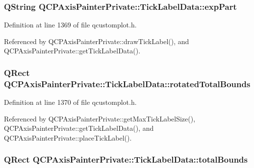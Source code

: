 \subsubsection[{exp\+Part}]{\setlength{\rightskip}{0pt plus 5cm}Q\+String Q\+C\+P\+Axis\+Painter\+Private\+::\+Tick\+Label\+Data\+::exp\+Part}\label{struct_q_c_p_axis_painter_private_1_1_tick_label_data_a09692e4ea092137278b4ac051d5fdf2b}


Definition at line 1369 of file qcustomplot.\+h.



Referenced by Q\+C\+P\+Axis\+Painter\+Private\+::draw\+Tick\+Label(), and Q\+C\+P\+Axis\+Painter\+Private\+::get\+Tick\+Label\+Data().

\hypertarget{struct_q_c_p_axis_painter_private_1_1_tick_label_data_aa4d38c5ea47c9184a78ee33ae7f1012e}{}
\subsubsection[{rotated\+Total\+Bounds}]{\setlength{\rightskip}{0pt plus 5cm}Q\+Rect Q\+C\+P\+Axis\+Painter\+Private\+::\+Tick\+Label\+Data\+::rotated\+Total\+Bounds}\label{struct_q_c_p_axis_painter_private_1_1_tick_label_data_aa4d38c5ea47c9184a78ee33ae7f1012e}


Definition at line 1370 of file qcustomplot.\+h.



Referenced by Q\+C\+P\+Axis\+Painter\+Private\+::get\+Max\+Tick\+Label\+Size(), Q\+C\+P\+Axis\+Painter\+Private\+::get\+Tick\+Label\+Data(), and Q\+C\+P\+Axis\+Painter\+Private\+::place\+Tick\+Label().

\hypertarget{struct_q_c_p_axis_painter_private_1_1_tick_label_data_afbb3163cf4c628914f1b703945419ea5}{}
\subsubsection[{total\+Bounds}]{\setlength{\rightskip}{0pt plus 5cm}Q\+Rect Q\+C\+P\+Axis\+Painter\+Private\+::\+Tick\+Label\+Data\+::total\+Bounds}\label{struct_q_c_p_axis_painter_private_1_1_tick_label_data_afbb3163cf4c628914f1b703945419ea5}


